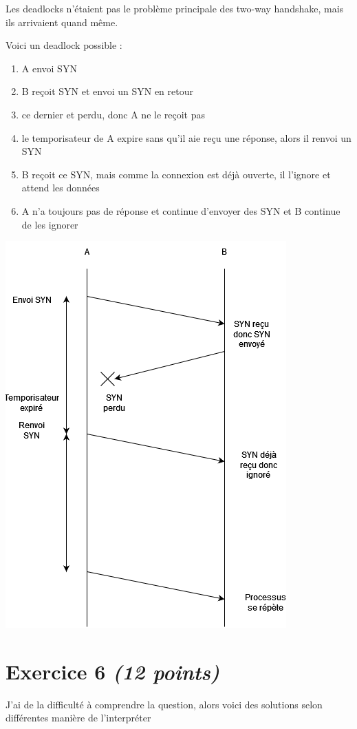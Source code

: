 \documentclass{article}
\begin{document}
Les deadlocks n'étaient pas le problème principale des two-way handshake, mais ils arrivaient quand même.

Voici un deadlock possible :
\begin{enumerate}
    \item A envoi SYN
    \item B reçoit SYN et envoi un SYN en retour
    \item ce dernier et perdu, donc A ne le reçoit pas
    \item le temporisateur de A expire sans qu'il aie reçu une réponse, alors il renvoi un SYN
    \item B reçoit ce SYN, mais comme la connexion est déjà ouverte, il l'ignore et attend les données
    \item A n'a toujours pas de réponse et continue d'envoyer des SYN et B continue de les ignorer
\end{enumerate}

\includegraphics[scale=1]{q5.png}


\clearpage

\section{Exercice 6 \emph{(12 points)}}
J'ai de la difficulté à comprendre la question, alors voici des solutions selon différentes manière de l'interpréter
\end{document}
